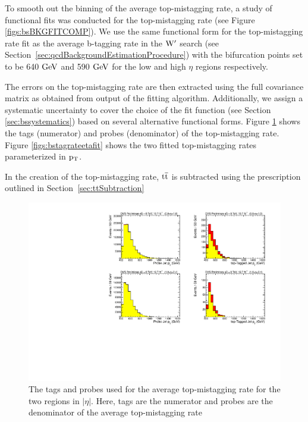 To smooth out the binning of the average top-mistagging rate, a study of functional fits was conducted for the top-mistagging rate (see Figure \ref{figs:bsBKGFITCOMP}).
We use the same functional form for the top-mistagging rate fit as the average b-tagging rate in the $\mathrm{W}^{\prime}$ search (see Section~\ref{sec:qcdBackgroundEstimationProcedure})
with the bifurcation points set to be 640$~\mathrm{GeV}$ and 590$~\mathrm{GeV}$ for the low and high $\eta$ regions respectively.

The errors on the top-mistagging rate are then extracted using the full covariance matrix as obtained from output of the fitting 
algorithm.   
Additionally, we assign a systematic uncertainty to cover the choice of the fit function (see Section \ref{sec:bssystematics}) 
based on several alternative functional forms.
Figure \ref{figs:bstagsandprobes8TeV} shows the tags (numerator) and probes (denominator) of the top-mistagging rate.
Figure \ref{figs:bstagrateetafit} shows the two fitted top-mistagging rates parameterized in $\mathrm{p_{T}}$.  

In the creation of the top-mistagging rate, $\mathrm{t\overline{t}}$ is subtracted using the prescription outlined in Section~\ref{sec:ttSubtraction}
\begin{figure}[htcb]
\centering
\includegraphics[width=1.0\textwidth]{AN-14-049/figs/tagsandprobes}
\caption{The tags and probes used for the average top-mistagging rate for the two regions in $|\eta|$.  
Here, tags are the numerator and probes are the denominator of the average top-mistagging rate}
\label{figs:bstagsandprobes8TeV}
\end{figure}

